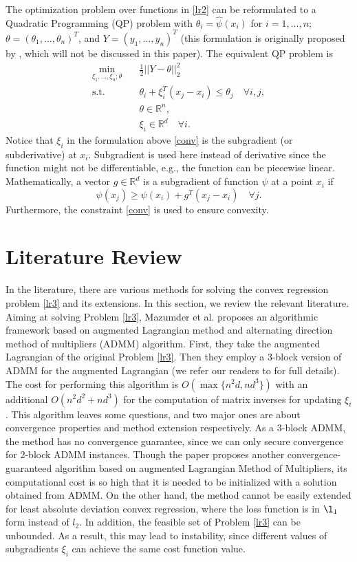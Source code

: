 \documentclass{article}
\begin{document}
The optimization problem over functions in \eqref{lr2} can be reformulated to a  Quadratic Programming (QP) problem with $\theta_i = \hat{\psi}(x_i)$ for $i=1,\dots,n$; $\theta=(\theta_1,\dots,\theta_n)^T$, and $Y=(y_1,\dots,y_n)^T$ (this formulation is originally proposed by \cite{Seijo11}, which will not be discussed in this paper). The equivalent QP problem is
\begin{align}  \label{lr3}
    \min_{\xi_1,\dots,\xi_n;\theta} \quad &\frac{1}{2}||Y-\theta||_2^2 \\
    \label{conv}
    \textrm{s.t.} \quad\quad  &\theta_i+\xi_i^T(x_j-x_i) \leq \theta_j \quad \forall i,j, \\
    &\theta \in \mathbb{R}^n, \\
    &\xi_i \in \mathbb{R}^d \quad \forall i.
\end{align}
Notice that $\xi_i$ in the formulation above \eqref{conv} is the subgradient (or subderivative) at $x_i$. Subgradient is used here instead of derivative since the function might not be differentiable, e.g., the function can be piecewise linear. Mathematically, a vector $g\in \mathbb{R}^d$ is a subgradient of function $\psi$ at a point $x_i$ if
\begin{equation} \label{subgradient}
    \psi(x_j) \geq \psi(x_i)+g^T(x_j-x_i) \quad \forall j.
\end{equation}
Furthermore, the constraint \eqref{conv} is used to ensure convexity.

\section{Literature Review} \label{s3}
In the literature, there are various methods for solving the convex regression problem \eqref{lr3} and its extensions. In this section, we review the relevant literature. Aiming at solving Problem \eqref{lr3}, Mazumder et al. \cite{Mazumder18} proposes an algorithmic framework based on augmented Lagrangian method and alternating direction method of multipliers (ADMM) algorithm. First, they take the augmented Lagrangian of the original Problem \eqref{lr3}. Then they employ a 3-block version of ADMM for the augmented Lagrangian (we refer our readers to \cite{Mazumder18} for full details). The cost for performing this algorithm is $O(\max\{n^2d,nd^3\})$ with an additional $O(n^2d^2+nd^3)$ for the computation of matrix inverses for updating $\xi_i$. This algorithm leaves some questions, and two major ones are about convergence properties and method extension respectively. As a 3-block ADMM, the method has no convergence guarantee, since we can only secure convergence for 2-block ADMM instances. Though the paper proposes another convergence-guaranteed algorithm based on augmented Lagrangian Method of Multipliers, its computational cost is so high that it is needed to be initialized with a solution obtained from ADMM. On the other hand, the method cannot be easily extended for least absolute deviation convex regression, where the loss function is in $\l_1$ form instead of $l_2$. In addition, the feasible set of Problem \eqref{lr3} can be unbounded. As a result, this may lead to instability, since different values of subgradients $\xi_i$ can achieve the same cost function value. 
\end{document}

